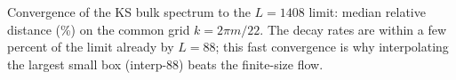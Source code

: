 \begin{table}[t]
\centering
\caption{Convergence of the KS bulk spectrum to the $L=1408$ limit: median
relative distance (\%) on the common grid $k=2\pi m/22$. The decay rates are
within a few percent of the limit already by $L=88$; this fast convergence is why
interpolating the largest small box (interp-88) beats the finite-size flow.}
\label{tab:convergence}
\small

\end{table}
